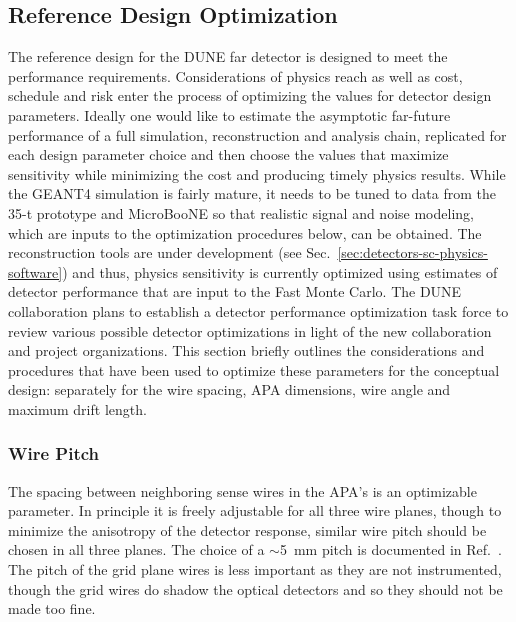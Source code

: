 \subsection{Reference Design Optimization}
\label{sec:detectors-fd-ref-optimization}

The reference design for the DUNE far detector is designed to meet the
performance requirements. Considerations of physics reach as well as
cost, schedule and risk enter the process of optimizing the values for
detector design parameters. Ideally one would like to estimate the
asymptotic far-future performance of a full simulation, reconstruction
and analysis chain, replicated for each design parameter choice and
then choose the values that maximize sensitivity while minimizing the
cost and producing timely physics results. While the GEANT4 simulation
is fairly mature, it needs to be tuned to data from the 35-t prototype
and MicroBooNE so that realistic signal and noise modeling, which are
inputs to the optimization procedures below, can be obtained. The
reconstruction tools are under development (see
Sec.~\ref{sec:detectors-sc-physics-software}) and thus, physics
sensitivity is currently optimized using estimates of detector
performance that are input to the Fast Monte Carlo. The DUNE
collaboration plans to establish a detector performance optimization
task force to review various possible detector optimizations in light
of the new collaboration and project organizations.  This section
briefly outlines the considerations and procedures that have been used
to optimize these parameters for the conceptual design: separately for
the wire spacing, APA dimensions, wire angle and maximum drift length.

\subsubsection{Wire Pitch}

The spacing between neighboring sense wires in the APA's is an optimizable parameter.  In principle
it is freely adjustable for all three wire planes, though to minimize the anisotropy of the
detector response, similar wire pitch should be chosen in all three planes.  The choice of
a $\sim$5~mm pitch is documented in Ref.~\cite{docdb-3407}.  The pitch of the
grid plane wires is less important as they are not instrumented,
though the grid wires do shadow the optical detectors and so
they should not be made too fine.

